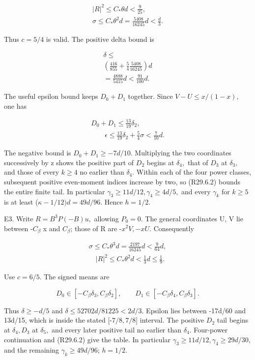 \[
\begin{gathered}
|R|^2\le C_*\theta d<\frac9{25},\qquad\\
\sigma\le C_*\theta^2d=\frac{5408}{16245}d<\frac d3.
\end{gathered}
\]

Thus \(c=5/4\) is valid. The positive delta bound is

\[
\begin{gathered}
\delta\le\\
\left(\frac{416}{855}+\frac54\frac{5408}{16245}\right)d\\
=\frac{4888}{5415}d<\frac{91}{100}d.
\end{gathered}
\]

The useful epsilon bound keeps \(D_0+D_1\) together. Since
\(V-U\le x/(1-x),\allowbreak \) one has

\[
\begin{gathered}
D_0+D_1\le\frac{13}{19}\delta_2,\\
\qquad \epsilon\le\frac{13}{19}\delta_2+\frac54\sigma<\frac7{10}d.
\end{gathered}
\]

The negative bound is \(D_0+D_1\ge -7d/10.\) Multiplying the two
coordinates successively by z shows the positive part of \(D_2\) begins
at \(\delta_4,\allowbreak \) that of \(D_3\) at \(\delta_3,\allowbreak \) and those of every \(k\ge 4\) no earlier than
\(\delta_4.\) Within each of the four power classes, subsequent positive
even-moment indices increase by two, so (R29.6.2) bounds the entire finite
tail. In particular \(\gamma_3\ge 11d/12,\allowbreak  \gamma_4\ge 4d/5,\allowbreak \) and every
\(\gamma_k\) for \(k\ge 5\) is at least (\(\kappa-1/12)d=49d/96.\) Hence \(h=1/2.\)

E3. Write \(R=B^3P(-B)u,\allowbreak \) allowing \(P_0=0.\) The general coordinates
U, V lie between -\(C_\beta\) x and \(C_\beta\); those of R are
-\(x^2V,\allowbreak -xU.\) Consequently

\[
\begin{gathered}
\sigma\le C_*\theta^3d=\frac{2197}{16245}d<\frac9{64}d,\\
\quad |R|^2\le C_*\theta^2d<\frac13d\le\frac19.
\end{gathered}
\]

Use \(c=6/5.\) The signed means are

\[
 D_0\in[-C_\beta \delta_3,C_\beta \delta_2],\qquad
 D_1\in[-C_\beta \delta_4,C_\beta \delta_3].
\]

Thus \(\delta\ge -d/5\) and
\(\delta\le 52702d/81225<2d/3.\) Epsilon lies between -17d/60 and
13d/15, which is inside the stated [-\(7/8,\allowbreak  7/8\)] interval.
The positive \(D_2\) tail begins at \(\delta_4,\allowbreak  D_3\) at \(\delta_5,\allowbreak \) and every later
positive tail no earlier than \(\delta_4.\) Four-power continuation and (R29.6.2)
give the table. In particular \(\gamma_3\ge 11d/12,\allowbreak  \gamma_4\ge 29d/30,\allowbreak \) and the remaining \(\gamma_k\ge 49d/96\); \(h=1/2.\)

